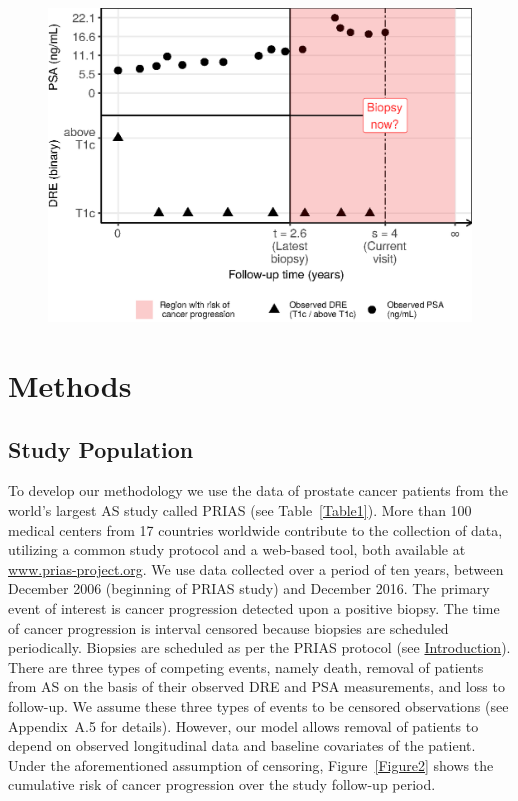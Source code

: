 \documentclass[a4paper, 12pt]{article}
\begin{document}
\begin{figure}[!htb]
\captionsetup{justification=justified}
\centerline{\includegraphics[width=\columnwidth]{Figure1.eps}}

\label{Figure1}
\end{figure}

\section{Methods}
\label{sec:methods}
\subsection{Study Population}
\label{subsec:study_population}
To develop our methodology we use the data of prostate cancer patients from the world's largest AS study called PRIAS \citep{bokhorst2016decade} (see Table~\ref{Table1}). More than 100 medical centers from 17 countries worldwide contribute to the collection of data, utilizing a common study protocol and a web-based tool, both available at \url{www.prias-project.org}. We use data collected over a period of ten years, between December 2006 (beginning of PRIAS study) and December 2016. The primary event of interest is cancer progression detected upon a positive biopsy. The time of cancer progression is interval censored because biopsies are scheduled periodically. Biopsies are scheduled as per the PRIAS protocol (see \hyperref[sec:introduction]{Introduction}). There are three types of competing events, namely death, removal of patients from AS on the basis of their observed DRE and PSA measurements, and loss to follow-up. We assume these three types of events to be censored observations (see Appendix~A.5 for details). However, our model allows removal of patients to depend on observed longitudinal data and baseline covariates of the patient. Under the aforementioned assumption of censoring, Figure~\ref{Figure2} shows the cumulative risk of cancer progression over the study follow-up period.
\end{document}
